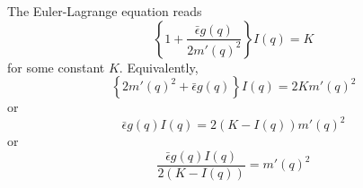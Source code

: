 \documentclass[12pt]{article}
\begin{document}
The Euler-Lagrange equation reads
\begin{equation*}
\left\{1+\frac{\bar{\epsilon}g(q)}{2m'(q)^2}\right\}I(q)=K
\end{equation*}
for some constant $K$. Equivalently,
\begin{equation*}
\left\{2m'(q)^2+\bar{\epsilon}g(q)\right\}I(q)=2Km'(q)^2
\end{equation*}
or
\begin{equation*}
\bar{\epsilon}g(q)I(q)=2(K-I(q))m'(q)^2
\end{equation*}
or
\begin{equation*}
\frac{\bar{\epsilon}g(q)I(q)}{2(K-I(q))}=m'(q)^2
\end{equation*}
\end{document}
